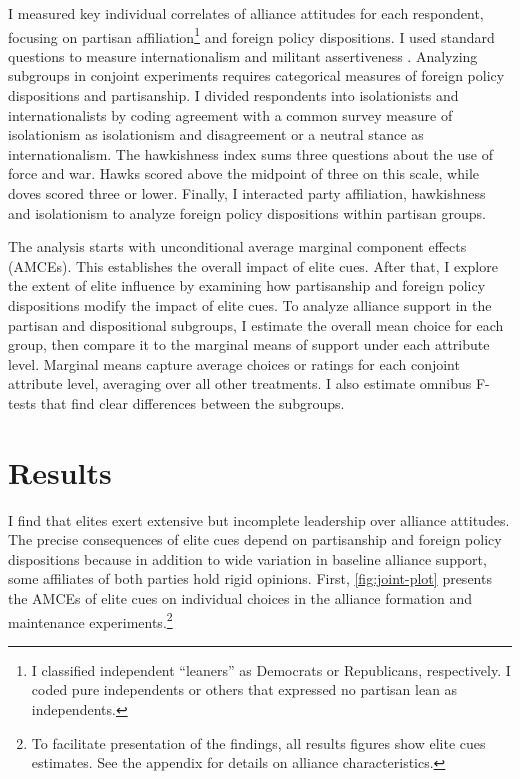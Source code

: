 \documentclass[12pt]{article}
\begin{document}
I measured key individual correlates of alliance attitudes for each respondent, focusing on partisan affiliation\footnote{I classified independent ``leaners'' as Democrats or Republicans, respectively. I coded pure independents or others that expressed no partisan lean as independents.} and foreign policy dispositions. 
I used standard questions to measure internationalism and militant assertiveness \citep{KertzerBrutger2016}.
Analyzing subgroups in conjoint experiments requires categorical measures of foreign policy dispositions and partisanship. 
I divided respondents into isolationists and internationalists by coding agreement with a common survey measure of isolationism as isolationism and disagreement or a neutral stance as internationalism. 
The hawkishness index sums three questions about the use of force and war. 
Hawks scored above the midpoint of three on this scale, while doves scored three or lower. 
Finally, I interacted party affiliation, hawkishness and isolationism to analyze foreign policy dispositions within partisan groups.


The analysis starts with unconditional average marginal component effects (AMCEs).
This establishes the overall impact of elite cues. 
After that, I explore the extent of elite influence by examining how partisanship and foreign policy dispositions modify the impact of elite cues. 
To analyze alliance support in the partisan and dispositional subgroups, I estimate the overall mean choice for each group, then compare it to the marginal means of support under each attribute level.
Marginal means capture average choices or ratings for each conjoint attribute level, averaging over all other treatments. 
I also estimate omnibus F-tests \citep{Leeperetal2020} that find clear differences between the subgroups.  


\section{Results} 


I find that elites exert extensive but incomplete leadership over alliance attitudes.
The precise consequences of elite cues depend on partisanship and foreign policy dispositions because in addition to wide variation in baseline alliance support, some affiliates of both parties hold rigid opinions. 
First, \autoref{fig:joint-plot} presents the AMCEs of elite cues on individual choices in the alliance formation and maintenance experiments.\footnote{To facilitate presentation of the findings, all results figures show elite cues estimates. See the appendix for details on alliance characteristics.}
\end{document}
